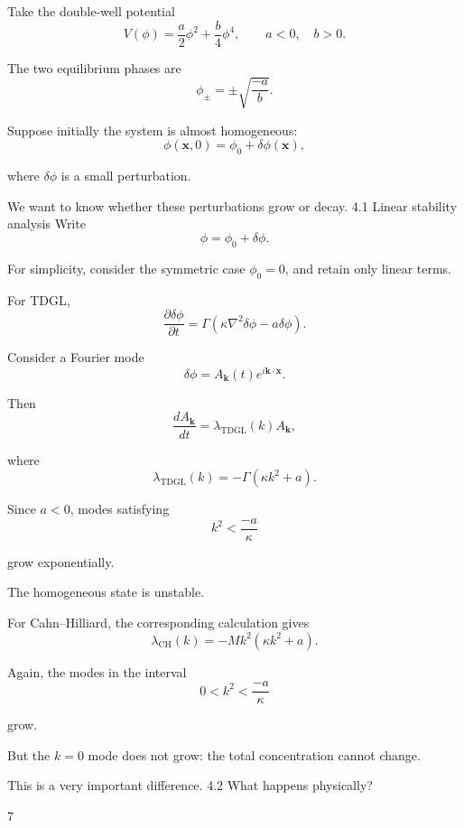Take the double-well potential
\[
V(\phi)=
\frac a2\phi^2+\frac b4\phi^4,
\qquad a<0,\quad b>0.
\]

The two equilibrium phases are
\[
\phi_\pm=\pm\sqrt{\frac{-a}{b}}.
\]

Suppose initially the system is almost homogeneous:
\[
\phi(\mathbf x,0)=\phi_0+\delta\phi(\mathbf x),
\]

where \(\delta\phi\) is a small perturbation.

We want to know whether these perturbations grow or decay.
4.1 Linear stability analysis
Write
\[
\phi=\phi_0+\delta\phi.
\]

For simplicity, consider the symmetric case \(\phi_0=0\), and retain only linear terms.

For TDGL,
\[
\frac{\partial\delta\phi}{\partial t}
=
\Gamma\left(
\kappa\nabla^2\delta\phi-a\delta\phi
\right).
\]

Consider a Fourier mode
\[
\delta\phi=
A_{\mathbf k}(t)e^{i\mathbf k\cdot\mathbf x}.
\]

Then
\[
\frac{dA_{\mathbf k}}{dt}
=
\lambda_{\mathrm{TDGL}}(k)A_{\mathbf k},
\]

where
\[
\boxed{
\lambda_{\mathrm{TDGL}}(k)
=
-\Gamma(\kappa k^2+a).
}
\]

Since \(a<0\), modes satisfying
\[
k^2<\frac{-a}{\kappa}
\]

grow exponentially.

The homogeneous state is unstable.

For Cahn–Hilliard, the corresponding calculation gives
\[
\boxed{
\lambda_{\mathrm{CH}}(k)
=
-Mk^2(\kappa k^2+a).
}
\]

Again, the modes in the interval
\[
0<k^2<\frac{-a}{\kappa}
\]

grow.

But the \(k=0\) mode does not grow: the total concentration cannot change.

This is a very important difference.
4.2 What happens physically?






















7











